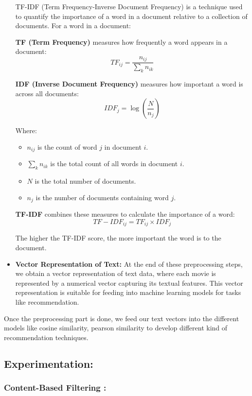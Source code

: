 \documentclass[a4paper]{article}
\theoremstyle{plain}
\theoremstyle{definition}
\begin{document}
\begin{itemize}
    TF-IDF (Term Frequency-Inverse Document Frequency) is a technique used to quantify the importance of a word in a document relative to a collection of documents. For a word in a document:

\textbf{TF (Term Frequency)} measures how frequently a word appears in a document:
\[
TF_{ij} = \frac{n_{ij}}{\sum_k n_{ik}}
\]

\textbf{IDF (Inverse Document Frequency)} measures how important a word is across all documents:
\[
IDF_{j} = \log\left(\frac{N}{n_j}\right)
\]

Where:
\begin{itemize}
    \item \( n_{ij} \) is the count of word \( j \) in document \( i \).
    \item \( \sum_k n_{ik} \) is the total count of all words in document \( i \).
    \item \( N \) is the total number of documents.
    \item \( n_j \) is the number of documents containing word \( j \).
\end{itemize}

\textbf{TF-IDF} combines these measures to calculate the importance of a word:
\[
TF-IDF_{ij} = TF_{ij} \times IDF_{j}
\]

The higher the TF-IDF score, the more important the word is to the document.

    \item \textbf{Vector Representation of Text:} At the end of these preprocessing steps, we obtain a vector representation of text data, where each movie is represented by a numerical vector capturing its textual features. This vector representation is suitable for feeding into machine learning models for tasks like recommendation.   

    
\end{itemize}

Once the preprocessing part is done, we feed our text vectors into the different models like cosine similarity, pearson similarity to develop different kind of recommendation techniques.





\subsection{\Large \color[RGB]{50,50,50} Experimentation:}
 \subsubsection{Content-Based Filtering : }
 
\end{document}
